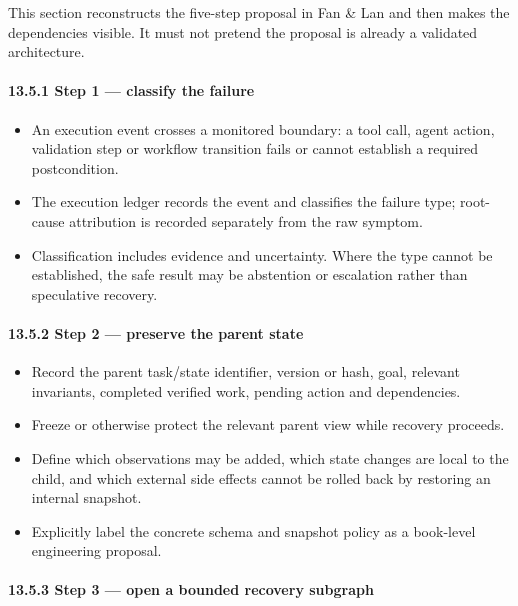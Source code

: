 This section reconstructs the five-step proposal in Fan \& Lan and then makes the dependencies visible. It must not pretend the proposal is already a validated architecture.

\paragraph{13.5.1 Step 1 --- classify the failure}\label{1351-step-1--classify-the-failure}

\begin{itemize}
\tightlist
\item
  An execution event crosses a monitored boundary: a tool call, agent action, validation step or workflow transition fails or cannot establish a required postcondition.
\item
  The execution ledger records the event and classifies the failure type; root-cause attribution is recorded separately from the raw symptom.
\item
  Classification includes evidence and uncertainty. Where the type cannot be established, the safe result may be abstention or escalation rather than speculative recovery.
\end{itemize}

\paragraph{13.5.2 Step 2 --- preserve the parent state}\label{1352-step-2--preserve-the-parent-state}

\begin{itemize}
\tightlist
\item
  Record the parent task/state identifier, version or hash, goal, relevant invariants, completed verified work, pending action and dependencies.
\item
  Freeze or otherwise protect the relevant parent view while recovery proceeds.
\item
  Define which observations may be added, which state changes are local to the child, and which external side effects cannot be rolled back by restoring an internal snapshot.
\item
  Explicitly label the concrete schema and snapshot policy as a book-level engineering proposal.
\end{itemize}

\paragraph{13.5.3 Step 3 --- open a bounded recovery subgraph}\label{1353-step-3--open-a-bounded-recovery-subgraph}

